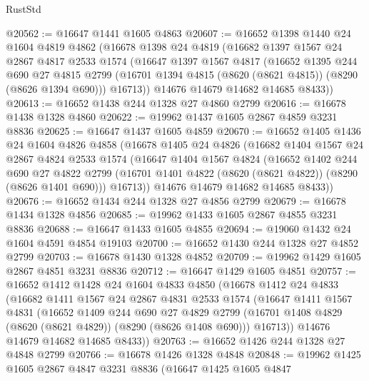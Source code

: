 \begin{lexlean}{RustStd}
\begin{coremodule}
@20562 := @16647 @1441 @1605 @4863
@20607 := @16652
    @1398
    @1440
    @24
    @1604
    @4819
    @4862
    (@16678
      @1398
      @24
      @4819
      (@16682
        @1397
        @1567
        @24
        @2867
        @4817
        @2533
        @1574
        (@16647
          @1397
          @1567
          @4817
          (@16652
            @1395
            @244
            @690
            @27
            @4815
            @2799
            (@16701 @1394 @4815 (@8620 (@8621 @4815)) (@8290 (@8626 @1394 @690)))
            @16713))
        @14676
        @14679
        @14682
        @14685
        @8433))
@20613 := @16652 @1438 @244 @1328 @27 @4860 @2799
@20616 := @16678 @1438 @1328 @4860
@20622 := @19962 @1437 @1605 @2867 @4859 @3231 @8836
@20625 := @16647 @1437 @1605 @4859
@20670 := @16652
    @1405
    @1436
    @24
    @1604
    @4826
    @4858
    (@16678
      @1405
      @24
      @4826
      (@16682
        @1404
        @1567
        @24
        @2867
        @4824
        @2533
        @1574
        (@16647
          @1404
          @1567
          @4824
          (@16652
            @1402
            @244
            @690
            @27
            @4822
            @2799
            (@16701 @1401 @4822 (@8620 (@8621 @4822)) (@8290 (@8626 @1401 @690)))
            @16713))
        @14676
        @14679
        @14682
        @14685
        @8433))
@20676 := @16652 @1434 @244 @1328 @27 @4856 @2799
@20679 := @16678 @1434 @1328 @4856
@20685 := @19962 @1433 @1605 @2867 @4855 @3231 @8836
@20688 := @16647 @1433 @1605 @4855
@20694 := @19060 @1432 @24 @1604 @4591 @4854 @19103
@20700 := @16652 @1430 @244 @1328 @27 @4852 @2799
@20703 := @16678 @1430 @1328 @4852
@20709 := @19962 @1429 @1605 @2867 @4851 @3231 @8836
@20712 := @16647 @1429 @1605 @4851
@20757 := @16652
    @1412
    @1428
    @24
    @1604
    @4833
    @4850
    (@16678
      @1412
      @24
      @4833
      (@16682
        @1411
        @1567
        @24
        @2867
        @4831
        @2533
        @1574
        (@16647
          @1411
          @1567
          @4831
          (@16652
            @1409
            @244
            @690
            @27
            @4829
            @2799
            (@16701 @1408 @4829 (@8620 (@8621 @4829)) (@8290 (@8626 @1408 @690)))
            @16713))
        @14676
        @14679
        @14682
        @14685
        @8433))
@20763 := @16652 @1426 @244 @1328 @27 @4848 @2799
@20766 := @16678 @1426 @1328 @4848
@20848 := @19962
    @1425
    @1605
    @2867
    @4847
    @3231
    @8836
    (@16647
      @1425
      @1605
      @4847

\end{coremodule}
\end{lexlean}

